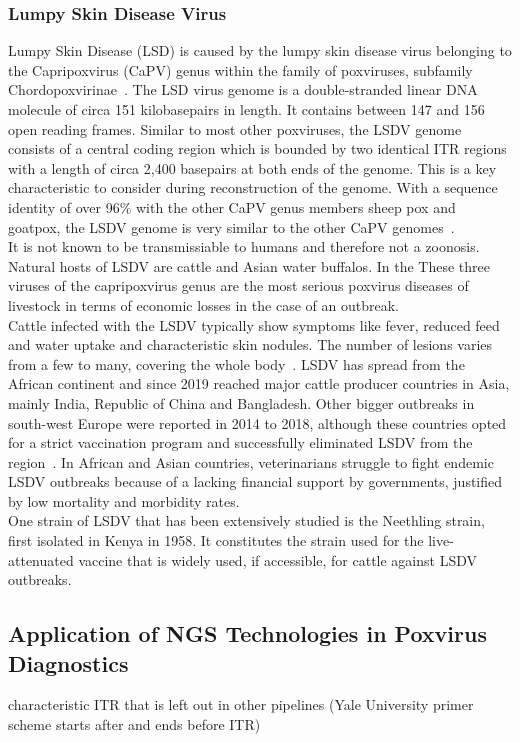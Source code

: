 \subsubsection*{Lumpy Skin Disease Virus}
Lumpy Skin Disease (LSD) is caused by the lumpy skin disease virus belonging to the Capripoxvirus (CaPV) genus within the family of poxviruses, subfamily Chordopoxvirinae~\cite{walker2019changes}. The LSD virus genome is a double-stranded linear DNA molecule of circa 151 kilobasepairs in length. It contains between 147 and 156 open reading frames. Similar to most other poxviruses, the LSDV genome consists of a central coding region which is bounded by two identical ITR regions with a length of circa 2,400 basepairs at both ends of the genome. This is a key characteristic to consider during reconstruction of the genome. With a sequence identity of over 96\% with the other CaPV genus members sheep pox and goatpox, the LSDV genome is very similar to the other CaPV genomes~\cite{tulman2001genome}.\\
It is not known to be transmissiable to humans and therefore not a zoonosis. Natural hosts of LSDV are cattle and Asian water buffalos. In the  These three viruses of the capripoxvirus genus are the most serious poxvirus diseases of livestock in terms of economic losses in the case of an outbreak. \\
Cattle infected with the LSDV typically show symptoms like fever, reduced feed and water uptake and characteristic skin nodules. The number of lesions varies from a few to many, covering the whole body~\cite{prozesky1982study}. LSDV has spread from the African continent and since 2019 reached major cattle producer countries in Asia, mainly India, Republic of China and Bangladesh. Other bigger outbreaks in south-west Europe were reported in 2014 to 2018, although these countries opted for a strict vaccination program and successfully eliminated LSDV from the region~\cite{prevention2017control}. In African and Asian countries, veterinarians struggle to fight endemic LSDV outbreaks because of a lacking financial support by governments, justified by low mortality and morbidity rates.\\
One strain of LSDV that has been extensively studied is the Neethling strain, first isolated in Kenya in 1958. It constitutes the strain used for the live-attenuated vaccine that is widely used, if accessible, for cattle against LSDV outbreaks. 

\subsection{Application of NGS Technologies in Poxvirus Diagnostics}
characteristic ITR that is left out in other pipelines (Yale University primer scheme starts after and ends before ITR)

